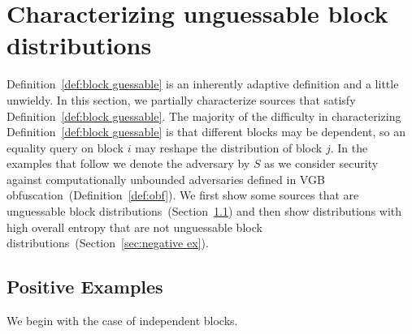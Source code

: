 \documentclass[11pt]{article}
\newcommand{\secref}[1]{\mbox{Section~\ref{#1}}}
\newcommand{\defref}[1]{\mbox{Definition~\ref{#1}}}
\newcommand{\consref}[1]{\mbox{Construction~\ref{#1}}}
\newcommand{\poly}{\ensuremath{\mathtt{poly}}\xspace}
\begin{document}
\section{Characterizing unguessable block distributions}
\label{sec:characterize}

\defref{def:block guessable} is an inherently adaptive definition and a little unwieldy.  In this section, we partially characterize sources that satisfy \defref{def:block guessable}.
The majority of the difficulty in characterizing \defref{def:block guessable} is that different blocks may be dependent, so an equality query on block $i$ may reshape the distribution of block $j$.  In the examples that follow we denote the adversary by $S$ as we consider security against computationally unbounded adversaries defined in VGB obfuscation~(\defref{def:obf}).  We first show some sources that are unguessable block distributions~(\secref{sec:positive ex}) and then show distributions with high overall entropy that are not unguessable block distributions~(\secref{sec:negative ex}).

\subsection{Positive Examples}
\label{sec:positive ex}
We begin with the case of independent blocks.  
\end{document}
